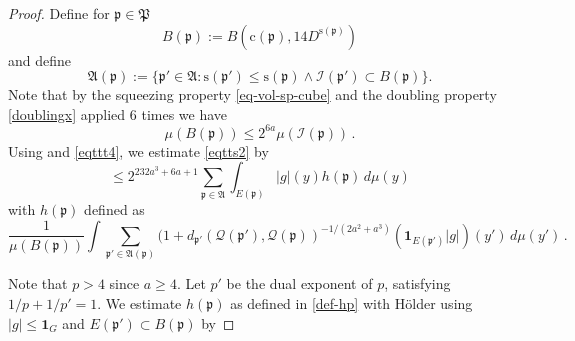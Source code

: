 \documentclass[10pt,a4paper]{article}
\theoremstyle{plain}
\theoremstyle{definition}
\numberwithin{equation}{subsection}
\newcommand{\fp}{{\mathfrak p}}
\newcommand{\fP}{{\mathfrak P}}
\newcommand{\pc}{{\mathrm{c}}}
\newcommand{\ps}{{\mathrm{s}}}
\newcommand{\scI}{{\mathcal{I}}} %
\newcommand{\fcc}{{\mathcal{Q}}}
\begin{document}
\begin{proof}
Define for $\fp\in \fP$
\begin{equation}
    B(\fp):=B(\pc(\fp), 14D^{\ps(\fp)})
\end{equation}
and define
\begin{equation}
    \label{eq-Dp-definition}
    \mathfrak{A}(\fp):=\{\fp'\in\mathfrak{A}: \ps(\fp')\leq \ps(\fp) \land \scI(\fp') \subset B(\fp)\}.
\end{equation}
Note that by the squeezing property \eqref{eq-vol-sp-cube}
and the doubling property \eqref{doublingx} applied
$6$ times we have
\begin{equation}\label{eqttt4}
    \mu(B(\fp))\le 2^{6a} \mu(\scI(\fp))\, .
\end{equation}
Using  and \eqref{eqttt4}, we estimate \eqref{eqtts2} by
\begin{equation}\label{eqtts3}
     \le 2^{232a^3+6a+1} \sum_{\fp\in \mathfrak{A}}
    \int_{E(\fp)}|g|(y) h(\fp)\, d\mu(y)
\end{equation}
with $h(\fp)$ defined as
\begin{equation}\label{def-hp}
    \frac 1{\mu(B(\fp))}\int \sum_{\fp'\in \mathfrak{A}(\fp)}
    {(1+d_{\fp'}(\fcc(\fp'), \fcc(\fp))^{-1/(2a^2+a^3)}}(\mathbf{1}_{E(\fp')}|g|)(y')\, d\mu(y')\,.
\end{equation}

Note that $p>4$ since $a\ge 4$. Let $p'$ be the dual exponent of $p$, satisfying $1/p+1/p'=1$.
We estimate $h(\fp)$ as defined in \eqref{def-hp} with H\"older using $|g|\le \mathbf{1}_G$ and $E(\fp')\subset B(\fp)$ by


\end{proof}
\end{document}
